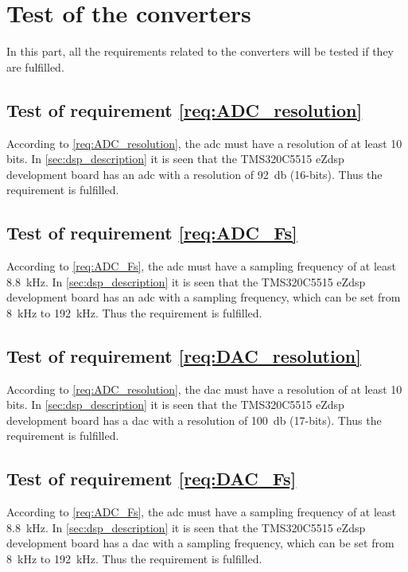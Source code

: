 \section{Test of the converters}
In this part, all the requirements related to the converters will be tested if they are fulfilled. 


\subsection{Test of requirement \autoref{req:ADC_resolution}}
According to \autoref{req:ADC_resolution}, the \gls{adc} must have a resolution of at least 10 bits. In \autoref{sec:dsp_description} it is seen that the TMS320C5515 eZdsp development board has an \gls{adc} with a resolution of \SI{92}{\decibel} (16-bits). Thus the requirement is fulfilled.  

\subsection{Test of requirement \autoref{req:ADC_Fs}}
According to \autoref{req:ADC_Fs}, the \gls{adc} must have a sampling frequency of at least \SI{8.8}{\kilo\hertz}. In \autoref{sec:dsp_description} it is seen that the TMS320C5515 eZdsp development board has an \gls{adc} with a sampling frequency, which can be set from \SI{8}{\kilo\hertz} to \SI{192}{\kilo\hertz}. Thus the requirement is fulfilled.

\subsection{Test of requirement \autoref{req:DAC_resolution}}
According to \autoref{req:ADC_resolution}, the \gls{dac} must have a resolution of at least 10 bits. In \autoref{sec:dsp_description} it is seen that the TMS320C5515 eZdsp development board has a \gls{dac} with a resolution of \SI{100}{\decibel} (17-bits). Thus the requirement is fulfilled.  

\subsection{Test of requirement \autoref{req:DAC_Fs}}
According to \autoref{req:ADC_Fs}, the \gls{adc} must have a sampling frequency of at least \SI{8.8}{\kilo\hertz}. In \autoref{sec:dsp_description} it is seen that the TMS320C5515 eZdsp development board has a \gls{dac} with a sampling frequency, which can be set from \SI{8}{\kilo\hertz} to \SI{192}{\kilo\hertz}. Thus the requirement is fulfilled.
 

